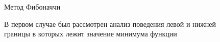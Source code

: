 \documentclass[11pt]{article}
\begin{document}
\begin{figure}[h]
\begin{minipage}[h]{0.47\linewidth}
             Метод Фибоначчи \\
        \end{minipage}
        \caption{В первом случае был рассмотрен анализ поведения левой и нижней границы в которых лежит значение минимума функции}
        \label{ris:experimentalcorrelationsignals}
    \end{figure}
\end{document}
